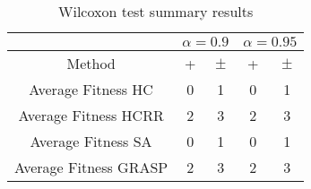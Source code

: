 \documentclass[a4paper,10pt]{article}
\begin{document}
\begin{table}[!htp]
\centering\scriptsize
\begin{tabular}{
|c|c|c|c|c|}
\hline
&\multicolumn{2}{c|}{$\alpha=0.9$} & \multicolumn{2}{c|}{$\alpha=0.95$}\\\hline
Method & + & $\pm$ & + & $\pm$ \\
\hline
Average Fitness HC       & 0 & 1 & 0 & 1\\
\hline
Average Fitness HCRR    & 2 & 3 & 2 & 3\\
\hline
Average Fitness SA      & 0 & 1 & 0 & 1\\
\hline
Average Fitness GRASP & 2 & 3 & 2 & 3\\
\hline

\end{tabular}
\caption{Wilcoxon test summary results}

\end{table}

 \clearpage 
\end{document}
